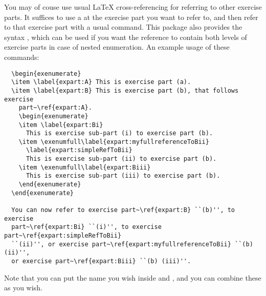 \documentclass[11pt,a4paper]{article}
\begin{document}
You may of couse use usual \LaTeX{} cross-referencing for referring to other exercise
parts. It suffices to use a  at the exercise part you want to refer to, and
then refer to that exercise part with a usual  command. This package also
provides the syntax , which can be used if you
want the reference to contain both levels of exercise parts in case of nested
enumeration. An example usage of these commands:
\begin{pkgverbatim}
\begin{verbatim}
  \begin{exenumerate}
  \item \label{expart:A} This is exercise part (a).
  \item \label{expart:B} This is exercise part (b), that follows exercise
    part~\ref{expart:A}.
    \begin{exenumerate}
    \item \label{expart:Bi}
      This is exercise sub-part (i) to exercise part (b).
    \item \exenumfull\label{expart:myfullreferenceToBii}
      \label{expart:simpleRefToBii}
      This is exercise sub-part (ii) to exercise part (b).
    \item \exenumfull\label{expart:Biii}
      This is exercise sub-part (iii) to exercise part (b).
    \end{exenumerate}
  \end{exenumerate}

  You can now refer to exercise part~\ref{expart:B} ``(b)'', to exercise
  part~\ref{expart:Bi} ``(i)'', to exercise part~\ref{expart:simpleRefToBii}
  ``(ii)'', or exercise part~\ref{expart:myfullreferenceToBii} ``(b) (ii)'',
  or exercise part~\ref{expart:Biii} ``(b) (iii)''.

\end{verbatim}
\end{pkgverbatim}
Note that you can put the name you wish inside  and
, and you can combine these as you wish.

\end{document}
